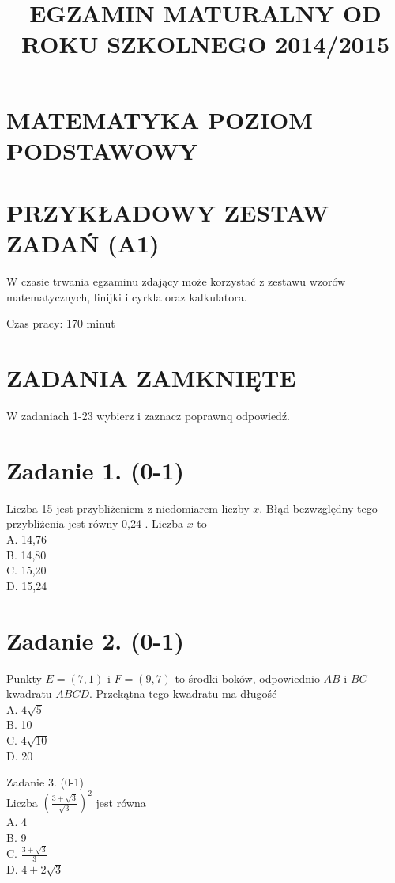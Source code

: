 \documentclass[10pt]{article}
\title{EGZAMIN MATURALNY OD ROKU SZKOLNEGO 2014/2015 }
\author{}
\date{}
\begin{document}
\maketitle
\section*{MATEMATYKA POZIOM PODSTAWOWY}
\section*{PRZYKŁADOWY ZESTAW ZADAŃ (A1)}
W czasie trwania egzaminu zdający może korzystać z zestawu wzorów matematycznych, linijki i cyrkla oraz kalkulatora.

Czas pracy: 170 minut

\section*{ZADANIA ZAMKNIĘTE}
W zadaniach 1-23 wybierz i zaznacz poprawnq odpowiedź.

\section*{Zadanie 1. (0-1)}
Liczba 15 jest przybliżeniem z niedomiarem liczby \(x\). Błąd bezwzględny tego przybliżenia jest równy 0,24 . Liczba \(x\) to\\
A. 14,76\\
B. 14,80\\
C. 15,20\\
D. 15,24

\section*{Zadanie 2. (0-1)}
Punkty \(E=(7,1)\) i \(F=(9,7)\) to środki boków, odpowiednio \(A B\) i \(B C\) kwadratu \(A B C D\). Przekątna tego kwadratu ma długość\\
A. \(4 \sqrt{5}\)\\
B. 10\\
C. \(4 \sqrt{10}\)\\
D. 20

Zadanie 3. (0-1)\\
Liczba \(\left(\frac{3+\sqrt{3}}{\sqrt{3}}\right)^{2}\) jest równa\\
A. 4\\
B. 9\\
C. \(\frac{3+\sqrt{3}}{3}\)\\
D. \(4+2 \sqrt{3}\)
\end{document}
